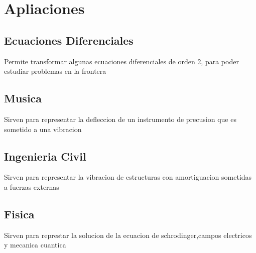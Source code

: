 \documentclass[12pt]{report}
\begin{document}
\section{Apliaciones}
\subsection{Ecuaciones Diferenciales}
Permite transformar algunas ecuaciones diferenciales de orden 2, para poder estudiar problemas en la frontera
\subsection{Musica}
Sirven para representar la defleccion de un instrumento de precusion que es sometido a una vibracion
\subsection{Ingenieria Civil}
Sirven para representar la vibracion de estructuras con amortiguacion sometidas a fuerzas externas 
\subsection{Fisica}
Sirven para represtar la solucion de la ecuacion de schrodinger,campos electricos y mecanica cuantica
\end{document}
